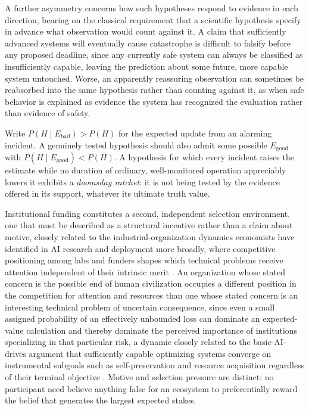 A further asymmetry concerns how such hypotheses respond to evidence in each direction, bearing on the classical requirement that a scientific hypothesis specify in advance what observation would count against it. A claim that sufficiently advanced systems will eventually cause catastrophe is difficult to falsify before any proposed deadline, since any currently safe system can always be classified as insufficiently capable, leaving the prediction about some future, more capable system untouched. Worse, an apparently reassuring observation can sometimes be reabsorbed into the same hypothesis rather than counting against it, as when safe behavior is explained as evidence the system has recognized the evaluation rather than evidence of safety.

\begin{definition}
\label{def:doomsday-ratchet}
Write $P(H \mid E_{\mathrm{bad}}) > P(H)$ for the expected update from an alarming incident. A genuinely tested hypothesis should also admit some possible $E_{\mathrm{good}}$ with $P(H \mid E_{\mathrm{good}}) < P(H)$. A hypothesis for which every incident raises the estimate while no duration of ordinary, well-monitored operation appreciably lowers it exhibits a \emph{doomsday ratchet}: it is not being tested by the evidence offered in its support, whatever its ultimate truth value.
\end{definition}

Institutional funding constitutes a second, independent selection environment, one that must be described as a structural incentive rather than a claim about motive, closely related to the industrial-organization dynamics economists have identified in AI research and deployment more broadly, where competitive positioning among labs and funders shapes which technical problems receive attention independent of their intrinsic merit \cite{varian2019}. An organization whose stated concern is the possible end of human civilization occupies a different position in the competition for attention and resources than one whose stated concern is an interesting technical problem of uncertain consequence, since even a small assigned probability of an effectively unbounded loss can dominate an expected-value calculation \cite{bostrom2013} and thereby dominate the perceived importance of institutions specializing in that particular risk, a dynamic closely related to the basic-AI-drives argument that sufficiently capable optimizing systems converge on instrumental subgoals such as self-preservation and resource acquisition regardless of their terminal objective \cite{omohundro2008}. Motive and selection pressure are distinct: no participant need believe anything false for an ecosystem to preferentially reward the belief that generates the largest expected stakes.


